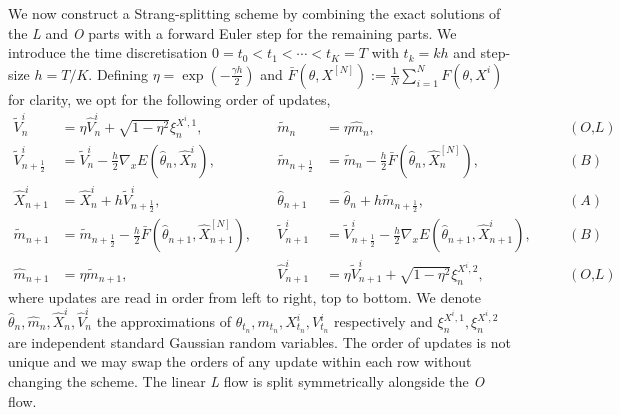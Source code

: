 We now construct a Strang-splitting scheme by combining the exact solutions of the \textit{L} and \textit{O} parts with a forward Euler step for the remaining parts. We introduce the time discretisation $0=t_0<t_1<\cdots<t_K=T$ with $t_k=kh$ and step-size $h=T/K$. Defining $\eta=\exp\left({-\frac{\gamma h}{2}}\right)$ and $\bar{F}\left(\theta,X^{[N]}\right):=\frac{1}{N}\sum_{i=1}^N F(\theta,X^i)$ for clarity, we opt for the following order of updates,
\begin{equation}\label{eq:full_discretisation}
\begin{alignedat}{3}
    \tilde{V}^i_{n} &= \eta\hat{V}^i_n+\sqrt{1-\eta^2}\xi^{X^i,1}_n,
    &\quad \tilde{m}_n &= \eta\hat{m}_n,
    &\quad &(\textit{O,L}) \\
    \tilde{V}^i_{n+\frac{1}{2}} &= \tilde{V}^i_n-\frac{h}{2}\nabla_xE\left(\hat{\theta}_n,\hat{X}^i_n\right),
    &\quad \tilde{m}_{n+\frac{1}{2}} &= \tilde{m}_n-\frac{h}{2} \bar{F}\left(\hat{\theta}_n,\hat{X}^{[N]}_{n}\right),
    &\quad &(\textit{B}) \\
    \hat{X}^i_{n+1} &= \hat{X}^i_n+ h\tilde{V}^i_{n+\frac{1}{2}},
    &\quad \hat{\theta}_{n+1} &= \hat{\theta}_n+h\tilde{m}_{n+\frac{1}{2}},
    &\quad &(\textit{A}) \\
    \tilde{m}_{n+1} &= \tilde{m}_{n+\frac{1}{2}}-\frac{h}{2} \bar{F}\left(\hat{\theta}_{n+1},\hat{X}^{[N]}_{n+1}\right),
    &\quad \tilde{V}^i_{n+1} &= \tilde{V}^i_{n+\frac{1}{2}}-\frac{h}{2}\nabla_xE\left(\hat{\theta}_{n+1},\hat{X}^i_{n+1}\right),
    &\quad &(\textit{B}) \\
    \hat{m}_{n+1} &= \eta\tilde{m}_{n+1},
    &\quad \hat{V}^i_{n+1} &= \eta\tilde{V}^i_{n+1}+\sqrt{1-\eta^2}\xi^{X^i,2}_n,
    &\quad &(\textit{O,L})
\end{alignedat}
\end{equation}
where updates are read in order from left to right, top to bottom. We denote $\hat\theta_n, \hat{m}_n, \hat{X}^i_n, \hat{V}^i_n$ the approximations of $\theta_{t_n}, m_{t_n}, X^i_{t_n}, V^i_{t_n}$ respectively and $\xi^{X^i,1}_n, \xi^{X^i,2}_n$ are independent standard Gaussian random variables. The order of updates is not unique and we may swap the orders of any update within each row without changing the scheme. The linear \textit{L} flow is split symmetrically alongside the \textit{O} flow.

